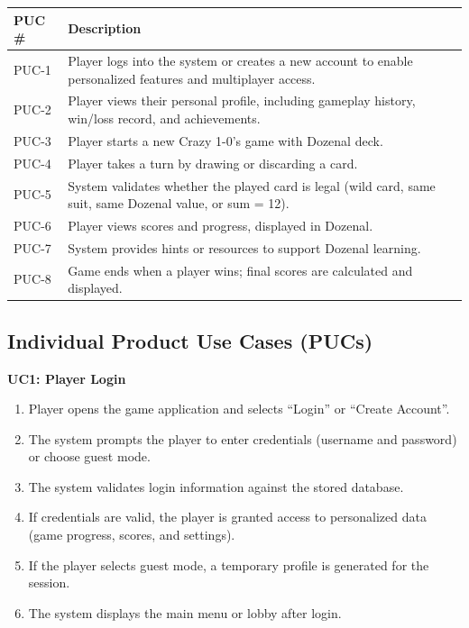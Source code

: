 \documentclass[12pt]{article}
\begin{document}
\begin{tabularx}{\textwidth}{|l|X|}
    \hline
    \textbf{PUC \#} & \textbf{Description} \\
    \hline
    PUC-1 & Player logs into the system or creates a new account to enable personalized features and multiplayer access. \\
    \hline
    PUC-2 & Player views their personal profile, including gameplay history, win/loss record, and achievements. \\
    \hline
    PUC-3 & Player starts a new Crazy 1-0's game with Dozenal deck. \\
    \hline
    PUC-4 & Player takes a turn by drawing or discarding a card. \\
    \hline
    PUC-5 & System validates whether the played card is legal (wild card, same suit, same Dozenal value, or sum = 12). \\
    \hline
    PUC-6 & Player views scores and progress, displayed in Dozenal. \\
    \hline
    PUC-7 & System provides hints or resources to support Dozenal learning. \\
    \hline
    PUC-8 & Game ends when a player wins; final scores are calculated and displayed. \\
    \hline
\end{tabularx}

\subsection{Individual Product Use Cases (PUCs)}

\noindent\textbf{UC1: Player Login}
\begin{enumerate}
    \item Player opens the game application and selects ``Login'' or ``Create Account''.
    \item The system prompts the player to enter credentials (username and password) or choose guest mode.
    \item The system validates login information against the stored database.
    \item If credentials are valid, the player is granted access to personalized data (game progress, scores, and settings).
    \item If the player selects guest mode, a temporary profile is generated for the session.
    \item The system displays the main menu or lobby after login.
\end{enumerate}
\end{document}
